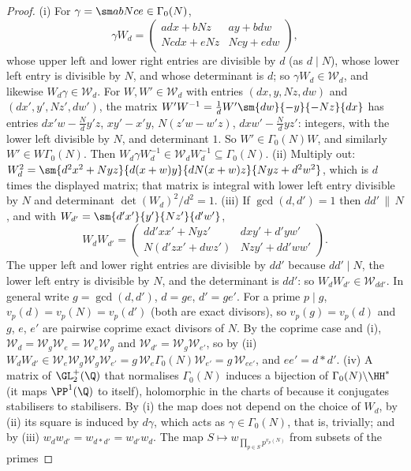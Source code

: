 \begin{proof}
(i) For $\gamma=\sm ab{Nc}e\in\Gamma_0(N)$,
\[
\gamma W_d=\begin{pmatrix}adx+bNz&ay+bdw\\Ncdx+eNz&Ncy+edw\end{pmatrix},
\]
whose upper left and lower right entries are divisible by $d$ (as $d\mid N$), whose lower left entry is divisible by $N$, and whose determinant is $d$; so $\gamma W_d\in\mathcal W_d$, and likewise
$W_d\gamma\in\mathcal W_d$. For $W,W'\in\mathcal W_d$ with entries $(dx,y,Nz,dw)$ and $(dx',y',Nz',dw')$, the matrix $W'W^{-1}=\frac1dW'\sm{dw}{-y}{-Nz}{dx}$ has entries
$dx'w-\frac Ndy'z$, $xy'-x'y$, $N(z'w-w'z)$, $dxw'-\frac Ndyz'$: integers, with the lower left divisible by $N$, and determinant $1$. So $W'\in\Gamma_0(N)W$, and similarly
$W'\in W\Gamma_0(N)$. Then $W_d\gamma W_d^{-1}\in\mathcal W_dW_d^{-1}\subseteq\Gamma_0(N)$.
(ii) Multiply out: $W_d^2=\sm{d^2x^2+Nyz}{d(x+w)y}{dN(x+w)z}{Nyz+d^2w^2}$, which is $d$ times the displayed matrix; that matrix is integral with lower left entry divisible by $N$ and
determinant $\det(W_d)^2/d^2=1$.
(iii) If $\gcd(d,d')=1$ then $dd'\,\|\,N$, and with $W_{d'}=\sm{d'x'}{y'}{Nz'}{d'w'}$,
\[
W_dW_{d'}=\begin{pmatrix}dd'xx'+Nyz'&dxy'+d'yw'\\N(d'zx'+dwz')&Nzy'+dd'ww'\end{pmatrix}.
\]
The upper left and lower right entries are divisible by $dd'$ because $dd'\mid N$, the lower left entry is divisible by $N$, and the determinant is $dd'$: so $W_dW_{d'}\in\mathcal W_{dd'}$. In general write $g=\gcd(d,d')$, $d=ge$, $d'=ge'$. For a prime $p\mid g$, $v_p(d)=v_p(N)=v_p(d')$ (both are
exact divisors), so $v_p(g)=v_p(d)$ and $g$, $e$, $e'$ are pairwise coprime exact divisors of $N$. By the coprime case and (i), $\mathcal W_d=\mathcal W_g\mathcal W_e=\mathcal W_e\mathcal W_g$ and $\mathcal W_{d'}=\mathcal W_g\mathcal W_{e'}$, so by
(ii) $W_dW_{d'}\in\mathcal W_e\mathcal W_g\mathcal W_g\mathcal W_{e'}=g\,\mathcal W_e\Gamma_0(N)\mathcal W_{e'}=g\,\mathcal W_{ee'}$, and $ee'=d*d'$.
(iv) A matrix of $\GL_2^+(\Q)$ that normalises $\Gamma_0(N)$ induces a bijection of $\Gamma_0(N)\backslash\HH^*$ (it maps $\PP^1(\Q)$ to itself), holomorphic in the charts of
 because it conjugates stabilisers to stabilisers. By (i) the map does not depend on the choice of $W_d$, by (ii) its square
is induced by $d\gamma$, which acts as $\gamma\in\Gamma_0(N)$, that is, trivially; and by (iii) $w_dw_{d'}=w_{d*d'}=w_{d'}w_d$. The map $S\mapsto w_{\prod_{p\in S}p^{v_p(N)}}$ from subsets of the primes

\end{proof}
